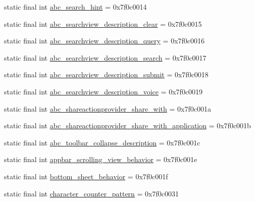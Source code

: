 \begin{DoxyCompactItemize}
\item 
static final int \mbox{\hyperlink{classandroid_1_1support_1_1design_1_1_r_1_1string_a49cacb037d06f1b5b99ad9093a9a78e5}{abc\+\_\+search\+\_\+hint}} = 0x7f0c0014
\item 
static final int \mbox{\hyperlink{classandroid_1_1support_1_1design_1_1_r_1_1string_ada43ec0fa6465dcc33878e45bd9d0fdf}{abc\+\_\+searchview\+\_\+description\+\_\+clear}} = 0x7f0c0015
\item 
static final int \mbox{\hyperlink{classandroid_1_1support_1_1design_1_1_r_1_1string_a02e8b7161ffa91e25f2f8623cec6b2cf}{abc\+\_\+searchview\+\_\+description\+\_\+query}} = 0x7f0c0016
\item 
static final int \mbox{\hyperlink{classandroid_1_1support_1_1design_1_1_r_1_1string_a6bf26a757b0d4c764952cc3795158341}{abc\+\_\+searchview\+\_\+description\+\_\+search}} = 0x7f0c0017
\item 
static final int \mbox{\hyperlink{classandroid_1_1support_1_1design_1_1_r_1_1string_a86402c10a07ce0ef57379f1e52663aeb}{abc\+\_\+searchview\+\_\+description\+\_\+submit}} = 0x7f0c0018
\item 
static final int \mbox{\hyperlink{classandroid_1_1support_1_1design_1_1_r_1_1string_a04a007dba1181292400d15625e31353a}{abc\+\_\+searchview\+\_\+description\+\_\+voice}} = 0x7f0c0019
\item 
static final int \mbox{\hyperlink{classandroid_1_1support_1_1design_1_1_r_1_1string_a77ff2da70667bbe5ae57ebdbdc2738ea}{abc\+\_\+shareactionprovider\+\_\+share\+\_\+with}} = 0x7f0c001a
\item 
static final int \mbox{\hyperlink{classandroid_1_1support_1_1design_1_1_r_1_1string_abe49db143c1d58a411f52de9775ac1f8}{abc\+\_\+shareactionprovider\+\_\+share\+\_\+with\+\_\+application}} = 0x7f0c001b
\item 
static final int \mbox{\hyperlink{classandroid_1_1support_1_1design_1_1_r_1_1string_a1eb7e00e0658289be2b77468cd353b75}{abc\+\_\+toolbar\+\_\+collapse\+\_\+description}} = 0x7f0c001c
\item 
static final int \mbox{\hyperlink{classandroid_1_1support_1_1design_1_1_r_1_1string_a87a9e93b543f76960b86c5e59fd5a9d0}{appbar\+\_\+scrolling\+\_\+view\+\_\+behavior}} = 0x7f0c001e
\item 
static final int \mbox{\hyperlink{classandroid_1_1support_1_1design_1_1_r_1_1string_a1c6d2a516e05169df1423d2d8344a239}{bottom\+\_\+sheet\+\_\+behavior}} = 0x7f0c001f
\item 
static final int \mbox{\hyperlink{classandroid_1_1support_1_1design_1_1_r_1_1string_ab455b3a5274912c418baa4c47031532e}{character\+\_\+counter\+\_\+pattern}} = 0x7f0c0031

\end{DoxyCompactItemize}
